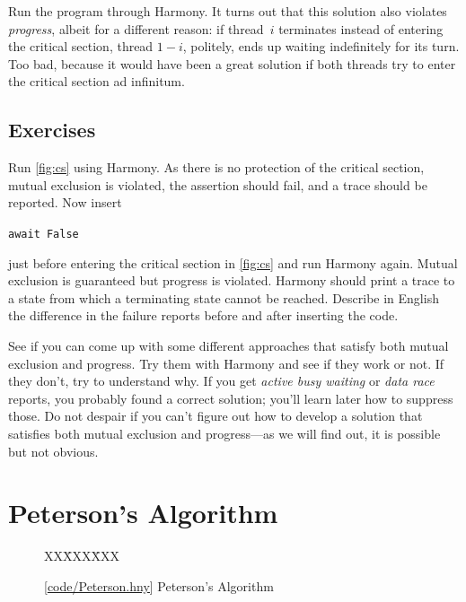 \documentclass{report}
\newcommand{\harmonysource}[1]{
\begin{tabbing}
XX\=XXX\=XXX\kill
    
\end{tabbing}
}
\newcommand{\harmonylink}[1]{%
[\href{https://harmony.cs.cornell.edu/#1}{\underline{#1}}]%
}
\newenvironment{code}{
\tcolorbox
}{
\endtcolorbox
}
\begin{document}
Run the program through Harmony.  It turns out that this solution also violates
\emph{progress}, albeit for a different reason:
if thread~$i$ terminates instead of entering the critical section,
thread $1-i$, politely, ends up waiting indefinitely for its turn.
Too bad, because it would have been a great solution if both
threads try to enter the critical section ad infinitum.

\section*{Exercises}
\begin{problems}
\item Run \autoref{fig:cs} using Harmony.  As there is no protection of the critical
section, mutual exclusion is violated,
the assertion should fail, and a trace should be reported.
Now insert
\begin{code}
\texttt{await False}
\end{code}
just before entering the critical section
in \autoref{fig:cs} and run Harmony again.
Mutual exclusion is guaranteed but progress is violated.
Harmony should print a trace
to a state from which a terminating state cannot be reached.
Describe in English the difference in the failure reports before
and after inserting the code.
\item See if you can come up with some different approaches that satisfy both
mutual exclusion and progress.  Try them with Harmony and see if they work or not.
If they don't, try to understand why.
If you get \emph{active busy waiting} or \emph{data race} reports, you probably
found a correct solution; you'll learn later how to suppress those.
Do not despair if you can't figure out how to develop a solution that satisfies both
mutual exclusion and progress---as we will find out, it is possible but not obvious.
\end{problems}

\chapter{Peterson's Algorithm}
\label{ch:peterson}
%

\begin{figure}
\begin{code}
\harmonysource{Peterson}
\end{code}
\caption{\harmonylink{code/Peterson.hny} Peterson's Algorithm}
\label{fig:peterson}
\end{figure}
\end{document}
